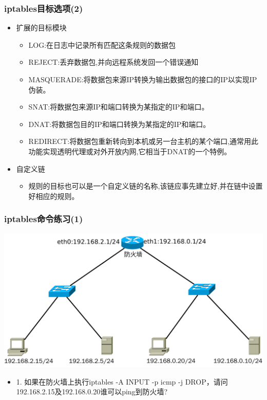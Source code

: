 \documentclass[xcolor=svgnames,presentation]{beamer}
\begin{document}
\begin{frame}
\frametitle{iptables目标选项(2)}
\label{sec-2-28}
\begin{itemize}

\item 扩展的目标模块
\label{sec-2-28-1}%
\begin{itemize}

\item LOG:在日志中记录所有匹配这条规则的数据包
\label{sec-2-28-1-1}%

\item REJECT:丢弃数据包,并向远程系统发回一个错误通知
\label{sec-2-28-1-2}%

\item MASQUERADE:将数据包来源IP转换为输出数据包的接口的IP以实现IP伪装。
\label{sec-2-28-1-3}%

\item SNAT:将数据包来源IP和端口转换为某指定的IP和端口。
\label{sec-2-28-1-4}%

\item DNAT:将数据包目的IP和端口转换为某指定的IP和端口。
\label{sec-2-28-1-5}%

\item REDIRECT:将数据包重新转向到本机或另一台主机的某个端口,通常用此功能实现透明代理或对外开放内网,它相当于DNAT的一个特例。
\label{sec-2-28-1-6}%
\end{itemize} %

\item 自定义链
\label{sec-2-28-2}%
\begin{itemize}

\item 规则的目标也可以是一个自定义链的名称,该链应事先建立好,并在链中设置好相应的规则。
\label{sec-2-28-2-1}%
\end{itemize} %
\end{itemize} %
\end{frame}
\begin{frame}
\frametitle{iptables命令练习(1)}
\label{sec-2-29}
\label{sec-2-29-1}

\includegraphics[width=.9\linewidth]{img/iptables-test.pdf}
\begin{itemize}

\item 1. 如果在防火墙上执行iptables -A INPUT -p icmp -j DROP，请问192.168.2.15及192.168.0.20谁可以ping到防火墙?
\label{sec-2-29-2}%
\end{itemize} %
\end{frame}
\end{document}

